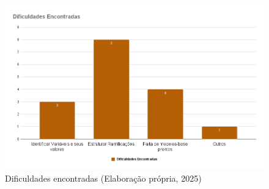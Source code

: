 \begin{figure}[ht]
	\centering
	\includegraphics[width=16cm]{./imagens/capitulo8/dificuldades-encontradas}
	\caption{Dificuldades encontradas  (Elaboração própria, 2025) }
	\label{fig:dificuldades-encontradas}
\end{figure}

	
